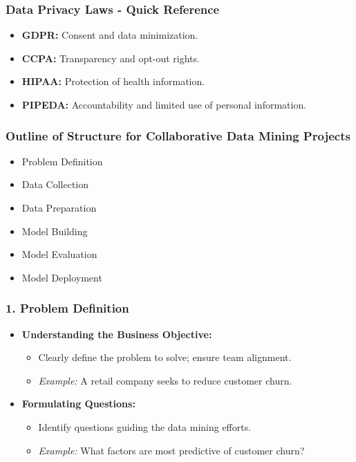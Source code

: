 \documentclass[aspectratio=169]{beamer}
\begin{document}
\begin{frame}[fragile]
    \frametitle{Data Privacy Laws - Quick Reference}
    \begin{itemize}
        \item \textbf{GDPR:} Consent and data minimization.
        \item \textbf{CCPA:} Transparency and opt-out rights.
        \item \textbf{HIPAA:} Protection of health information.
        \item \textbf{PIPEDA:} Accountability and limited use of personal information.
    \end{itemize}
\end{frame}

\begin{frame}
    \frametitle{Outline of Structure for Collaborative Data Mining Projects}
    \begin{itemize}
        \item Problem Definition
        \item Data Collection
        \item Data Preparation
        \item Model Building
        \item Model Evaluation
        \item Model Deployment
    \end{itemize}
\end{frame}

\begin{frame}[fragile]
    \frametitle{1. Problem Definition}
    \begin{itemize}
        \item \textbf{Understanding the Business Objective:}
            \begin{itemize}
                \item Clearly define the problem to solve; ensure team alignment.
                \item \textit{Example:} A retail company seeks to reduce customer churn.
            \end{itemize}
        \item \textbf{Formulating Questions:}
            \begin{itemize}
                \item Identify questions guiding the data mining efforts.
                \item \textit{Example:} What factors are most predictive of customer churn?
            \end{itemize}
    \end{itemize}
\end{frame}
\end{document}
